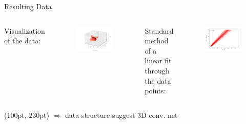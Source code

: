 \documentclass[10pt]{beamer}
\begin{document}
\begin{frame}{Resulting Data}
  \begin{columns}
    Visualization of the data:
    \begin{figure}[htp]
      \includegraphics[width=1.1\textwidth]{../images/data_display.pdf}
    \end{figure}
    Standard method of a linear fit through the data points:
    \begin{figure}[htp]
      \includegraphics[width=\textwidth]{../images/e-vs-sum_n_fit.pdf}
    \end{figure}
  \end{columns}
  \begin{textblock*}{250pt}(100pt, 230pt)
    $\Rightarrow$ data structure suggest 3D conv. net
  \end{textblock*}
\end{frame}
\end{document}
